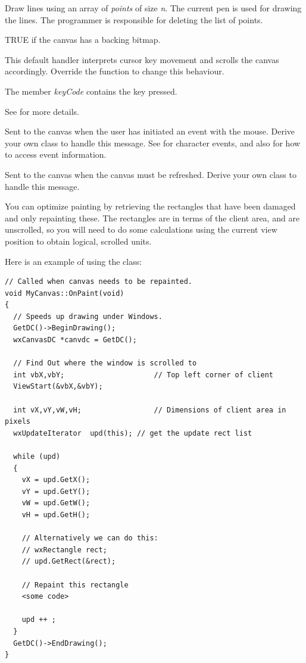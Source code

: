 Draw lines using an array of {\it points} of size {\it n}. The current pen is used
for drawing the lines.  The programmer is responsible for deleting the list of points.



TRUE if the canvas has a backing bitmap.

\label{wxcanvasonchar}


This default handler interprets cursor key movement and scrolls the
canvas accordingly.  Override the function to change this behaviour.

The member {\it keyCode} contains the key pressed.

See  for more details.

\label{wxcanvasonevent}


Sent to the canvas when the user has initiated an event with the mouse.
Derive your own class to handle this message. See \rtfsp
for character events, and also  for how to access
event information.

\label{wxcanvasonpaint}


Sent to the canvas when the canvas must be refreshed. Derive your own
class to handle this message.

You can optimize painting by retrieving the rectangles
that have been damaged and only repainting these. The rectangles are in
terms of the client area, and are unscrolled, so you will need to do
some calculations using the current view position to obtain logical,
scrolled units.

Here is an example of using the  class:

\begin{verbatim}
// Called when canvas needs to be repainted.
void MyCanvas::OnPaint(void)
{
  // Speeds up drawing under Windows.
  GetDC()->BeginDrawing();
  wxCanvasDC *canvdc = GetDC();

  // Find Out where the window is scrolled to
  int vbX,vbY;                     // Top left corner of client
  ViewStart(&vbX,&vbY);

  int vX,vY,vW,vH;                 // Dimensions of client area in pixels
  wxUpdateIterator	upd(this); // get the update rect list

  while (upd)
  {
    vX = upd.GetX();
    vY = upd.GetY();
    vW = upd.GetW();
    vH = upd.GetH();

    // Alternatively we can do this:
    // wxRectangle rect;
    // upd.GetRect(&rect);

    // Repaint this rectangle
    <some code>

    upd ++ ;
  }
  GetDC()->EndDrawing();
}
\end{verbatim}

